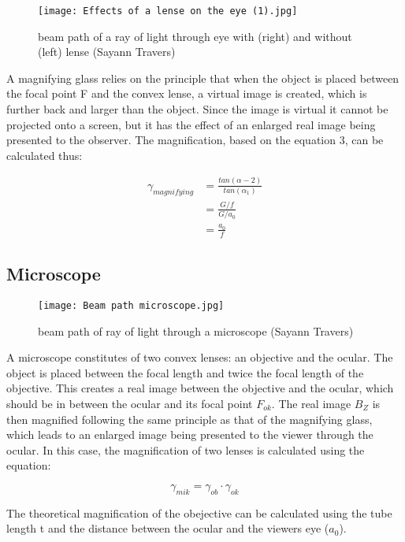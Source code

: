 \begin{figure}[h!]
    \centering
  \texttt{[image: Effects of a lense on the eye (1).jpg]}
  \caption{beam path of a ray of light through eye with (right) and without (left) lense (Sayann Travers)}
  \end{figure}

A magnifying glass relies on the principle that when the object is placed between the focal point F and the convex lense, a virtual 
image is created, which is further back and larger than the object. Since the image is virtual it cannot be projected onto a screen, 
but it has the effect of an enlarged real image being presented to the observer.
The magnification, based on the equation 3, can be calculated thus:

\begin{align*}
  \gamma_{magnifying} & = \frac{tan(\alpha-{2})}{tan(\alpha_{1})} \tag{4} \\
    & = \frac{G/f}{G/a_{0}} \tag{5} \\
    & = \frac{a_{0}}{f}      \tag{6}
\end{align*}

\subsection{Microscope}

\begin{figure}[h!]
    \centering
  \texttt{[image: Beam path microscope.jpg]}
  \caption{beam path of ray of light through a microscope (Sayann Travers)}
  \end{figure}

A microscope constitutes of two convex lenses: an objective and the ocular. The object is placed  between the focal length and twice the 
focal length of the objective. This creates a real image between the objective and the ocular, which should be in between the ocular and 
its focal point $F_{ok}$. The real image $B_{Z}$ is then magnified following the same principle as that of the magnifying glass, which leads to
an enlarged image being presented to the viewer through the ocular.
In this case, the magnification of two lenses is calculated using the equation:

\begin{equation}
  \gamma_{mik} = \gamma_{ob} \cdot \gamma_{ok} \tag{7}
  \end{equation}

The theoretical magnification of the obejective can be calculated using the tube length t and the distance between the ocular and the viewers
eye ($a_{0}$).

